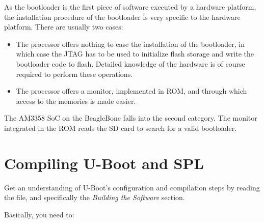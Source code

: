 
As the bootloader is the first piece of software executed by a
hardware platform, the installation procedure of the bootloader is
very specific to the hardware platform. There are usually two cases:

\begin{itemize}

\item The processor offers nothing to ease the installation of the
  bootloader, in which case the JTAG has to be used to initialize
  flash storage and write the bootloader code to flash. Detailed
  knowledge of the hardware is of course required to perform these
  operations.

\item The processor offers a monitor, implemented in ROM, and through
  which access to the memories is made easier.

\end{itemize}

{
The AM3358 SoC on the BeagleBone falls into the second category. The monitor
integrated in the ROM reads the SD card to search for a valid
bootloader.
}{}

\section{Compiling U-Boot and SPL}

Get an understanding of U-Boot's configuration and compilation steps
by reading the  file, and specifically the {\em Building
the Software} section.

Basically, you need to:

